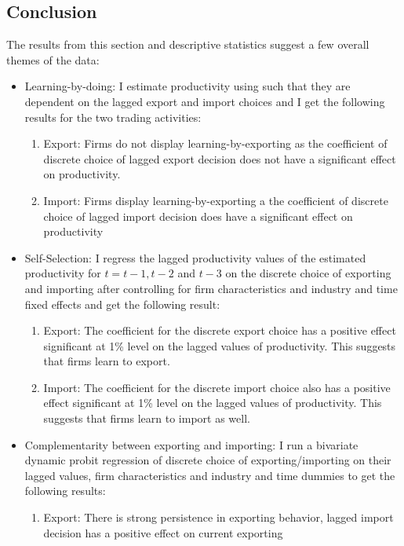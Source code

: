 \documentclass[11pt]{article}
\begin{document}
\subsection{Conclusion}

The results from this section and descriptive statistics suggest a few
overall themes of the data: 
\begin{itemize}
\item Learning-by-doing: I estimate productivity using
  \cite{levinsohn2003estimating} such that they are dependent on the
  lagged export and import choices and I get the following results for
  the two trading activities:
\begin{enumerate}
\item Export: Firms do not display learning-by-exporting as the
  coefficient of discrete choice of lagged export decision does not
  have a significant effect on productivity. 
\item Import: Firms display learning-by-exporting a the
  coefficient of discrete choice of lagged import decision does
  have a significant effect on productivity 
\end{enumerate}
\item Self-Selection: I regress the lagged productivity values of the
  estimated productivity for $t= t-1,t-2$ and $t-3$ on the discrete choice
  of exporting and importing after controlling for firm
  characteristics and industry and time fixed effects and get the
  following result:
\begin{enumerate}
\item Export: The coefficient for the discrete export choice has a
  positive effect significant at 1\% level on the lagged values of
  productivity. This suggests that firms learn to export.  
\item Import:  The coefficient for the discrete import choice also has a
  positive effect significant at 1\% level on the lagged values of
  productivity. This suggests that firms learn to import as well. 
\end{enumerate} 
\item Complementarity between exporting and importing: I run a
  bivariate dynamic probit regression of discrete choice of
  exporting/importing on their lagged values, firm characteristics and
  industry and time dummies to get the following results:
\begin{enumerate}
\item Export: There is strong persistence in exporting behavior,
  lagged import decision has a positive effect on current exporting

\end{enumerate}
\end{itemize}
\end{document}
